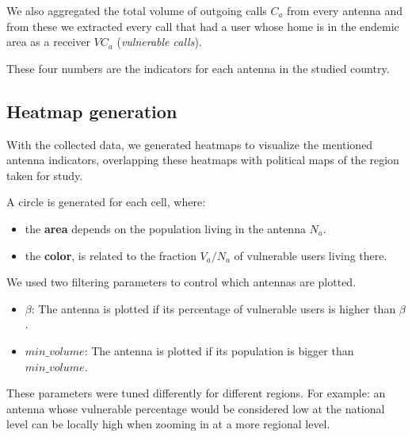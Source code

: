     We also aggregated the total volume of outgoing calls $C_a$ from every antenna and from these we extracted every call that had a user whose home is in the endemic area as a receiver $VC_a$ (\textit{vulnerable calls}).
    
    These four numbers are the indicators for each antenna in the studied country.

\subsection{Heatmap generation}
    With the collected data, we generated heatmaps to visualize the mentioned antenna indicators, overlapping these heatmaps with political maps of the region taken for study.
    
	A circle is generated for each cell, where:
	\begin{itemize}
		\item the \textbf{area} depends on the population living in the antenna $N_a$.
		\item the \textbf{color}, is related to the fraction $V_a / N_a$ of vulnerable users living there.
	\end{itemize}
    
    We used two filtering parameters to control which antennas are plotted.
    \begin{itemize}
        \item $\beta$: The antenna is plotted if its percentage of vulnerable users is higher than $\beta$.
        \item $min\_volume$: The antenna is plotted if its population is bigger than $min\_volume$.
    \end{itemize}
    
    These parameters were tuned differently for different regions. For example: an antenna whose vulnerable percentage would be considered low at the national level can be locally high when zooming in at a more regional level.
    
